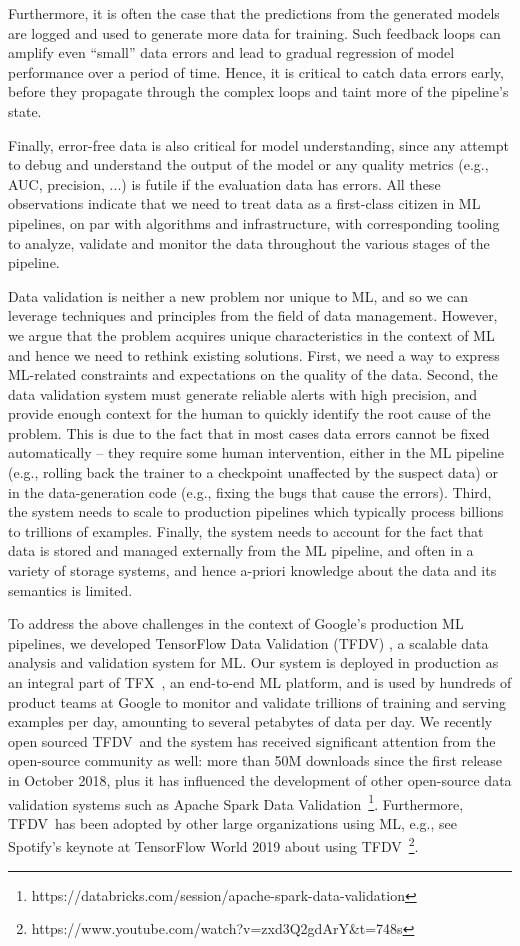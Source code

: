 \documentclass[11pt]{article}
\newcommand{\tfdv}{{\sf TFDV}}
\begin{document}
Furthermore, it is often the case that the predictions from the generated models are logged and used to generate more data for training. Such feedback loops can amplify even ``small'' data errors and lead to gradual regression of model performance over a period of time. Hence, it is critical to catch data errors early, before they propagate through the complex loops and taint more of the pipeline's state.

Finally, error-free data is also critical for model understanding, since any attempt to debug and understand the output of the model or any quality metrics (e.g., AUC, precision, ...) is futile if the evaluation data has errors. All these observations indicate that we need to treat data as a first-class citizen in ML pipelines, on par with algorithms and infrastructure, with corresponding tooling to analyze, validate and monitor the data throughout the various stages of the pipeline.

Data validation is neither a new problem nor unique to ML, and so we can leverage techniques and principles from the field of data management. However, we argue that the problem acquires unique characteristics in the context of ML and hence we need to rethink existing solutions. First, we need a way to express ML-related constraints and expectations on the quality of the data. Second, the data validation system must generate reliable alerts with high precision, and provide enough context for the human to quickly identify the root cause of the problem. This is due to the fact that in most cases data errors cannot be fixed automatically -- they require some human intervention, either in the ML pipeline (e.g., rolling back the trainer to a checkpoint unaffected by the suspect data) or in the data-generation code (e.g., fixing the bugs that cause the errors). Third, the system needs to scale to production pipelines which typically process billions to trillions of examples. Finally, the system needs to account for the fact that data is stored and managed externally from the ML pipeline, and often in a variety of storage systems, and hence a-priori knowledge about the data and its semantics is limited.

To address the above challenges in the context of Google's production ML pipelines, we developed TensorFlow Data Validation (\tfdv) \cite{tfdvdemo, tfdvsysml, tfdv}, a scalable data analysis and validation system for ML. Our system is deployed in production as an integral part of TFX~\cite{tfx}, an end-to-end ML platform, and is used by hundreds of product teams at Google to monitor and validate trillions of training and serving examples per day, amounting to several petabytes of data per day. We recently open sourced \tfdv\ and the system has received significant attention from the open-source community as well: more than 50M downloads since the first release in October 2018, plus it has influenced the development of other open-source data validation systems such as Apache Spark Data Validation~\footnote{https://databricks.com/session/apache-spark-data-validation}. Furthermore, \tfdv\ has been adopted by other large organizations using ML, e.g., see Spotify's keynote at TensorFlow World 2019 about using \tfdv\ \footnote{https://www.youtube.com/watch?v=zxd3Q2gdArY\&t=748s}.
\end{document}
